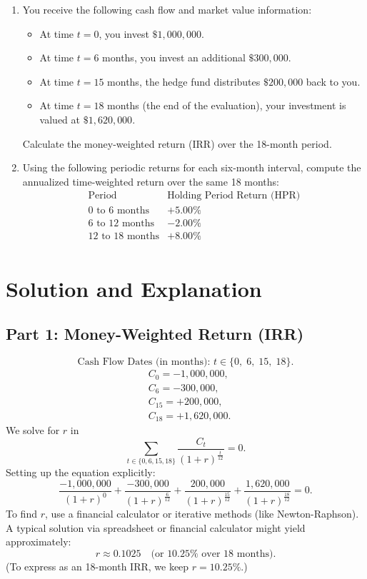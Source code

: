 \begin{enumerate}
\item You receive the following cash flow and market value information:
\begin{itemize}
\item At time \(t=0\), you invest \(\$1{,}000{,}000\).
\item At time \(t=6\) months, you invest an additional \(\$300{,}000\).
\item At time \(t=15\) months, the hedge fund distributes \(\$200{,}000\) back to you.
\item At time \(t=18\) months (the end of the evaluation), your investment is valued at \(\$1{,}620{,}000\).
\end{itemize}
Calculate the money-weighted return (IRR) over the 18-month period.

\item Using the following periodic returns for each six-month interval, compute the annualized time-weighted return over the same 18 months:
\[
\begin{array}{ll}
\text{Period} & \text{Holding Period Return (HPR)}\\
\hline
0 \text{ to } 6 \text{ months} & +5.00\% \\
6 \text{ to } 12 \text{ months} & -2.00\% \\
12 \text{ to } 18 \text{ months} & +8.00\% \\
\end{array}
\]
\end{enumerate}

\section*{Solution and Explanation}

\subsection*{Part 1: Money-Weighted Return (IRR)}
\[
\text{Cash Flow Dates (in months): } t \in \{0,\;6,\;15,\;18\}.
\]
\[
\begin{aligned}
&C_0 = -1{,}000{,}000,\\
&C_6 = -300{,}000, \\
&C_{15} = +200{,}000, \\
&C_{18} = +1{,}620{,}000. 
\end{aligned}
\]
We solve for \(r\) in
\[
\sum_{t \in \{0,6,15,18\}} \frac{C_t}{(1 + r)^{\frac{t}{12}}} = 0.
\]
Setting up the equation explicitly:
\[
\frac{-1{,}000{,}000}{(1+r)^0} + \frac{-300{,}000}{(1+r)^{\frac{6}{12}}} + \frac{200{,}000}{(1+r)^{\frac{15}{12}}} + \frac{1{,}620{,}000}{(1+r)^{\frac{18}{12}}} = 0.
\]
To find \(r\), use a financial calculator or iterative methods (like Newton-Raphson). A typical solution via spreadsheet or financial calculator might yield approximately:
\[
r \approx 0.1025 \quad \text{(or }10.25\%\text{ over 18 months).}
\]
(To express as an 18-month IRR, we keep \(r=10.25\%\).)

